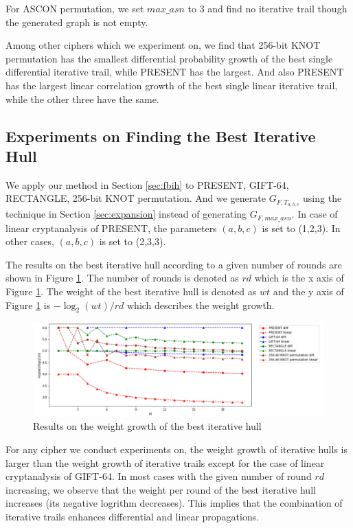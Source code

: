 For ASCON permutation, we set $max\_asn$ to 3 and find no iterative trail though the generated graph is not empty. 

Among other ciphers which we experiment on, we find that 256-bit KNOT permutation has the smallest differential probability growth of the best single differential iterative trail, while PRESENT has the largest. And also PRESENT has the largest linear correlation growth of the best single linear iterative trail, while the other three have the same. 

\subsection{Experiments on Finding the Best Iterative Hull}

We apply our method in Section \ref{sec:fbih} to PRESENT, GIFT-64, RECTANGLE, 256-bit KNOT permutation. And we generate $G_{F,T_{a,b,c}}$ using the technique in Section \ref{sec:expansion} instead of generating $G_{F,max\_asn}$. In case of linear cryptanalysis of PRESENT, the parameters $(a,b,c)$ is set to (1,2,3). In other cases, $(a,b,c)$ is set to (2,3,3).

The results on the best iterative hull according to a given number of rounds are shown in Figure \ref{fig:plot_ih}. The number of rounds is denoted as $rd$ which is the x axis of Figure \ref{fig:plot_ih}. The weight of the best iterative hull is denoted as $wt$ and the y axis of Figure \ref{fig:plot_ih} is $-\log_2(wt)/rd$ which describes the weight growth. 

\begin{figure}
	\centering
	\includegraphics[width=1\textwidth]{fig/plot_iterative_hulls.PNG}
	\caption{Results on the weight growth of the best iterative hull} \label{fig:plot_ih}
\end{figure}

For any cipher we conduct experiments on, the weight growth of iterative hulls is larger than the weight growth of iterative trails except for the case of linear cryptanalysis of GIFT-64. In most cases with the given number of round $rd$ increasing, we observe that the weight per round of the best iterative hull increases (its negative logrithm decreases). This implies that the combination of iterative trails enhances differential and linear propagations. 


